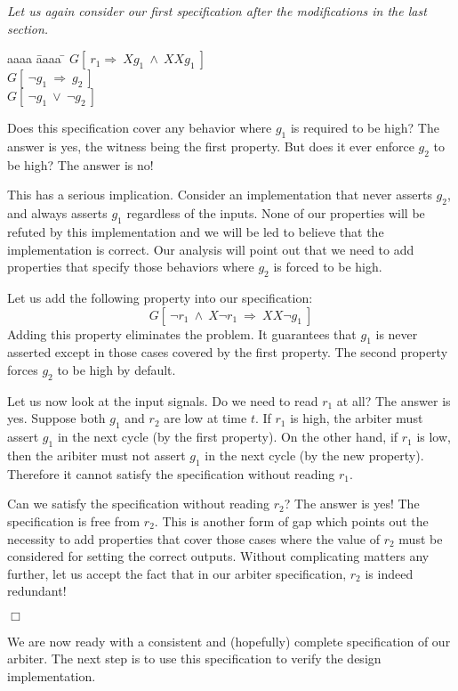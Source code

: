 \begin{example} \label{ex4}
{\em
Let us again consider our first specification after the modifications in the
last section.
\begin{tabbing}
aaaa \= aaaa \= \kill
\> $G[\ r_1 \Rightarrow\  Xg_1\ \land\  XXg_1\ ]$ \\
\> $G[\ \neg g_1\ \Rightarrow\  g_2\ ]$\\
\> $G[\ \neg g_1\ \lor\ \neg g_2\ ]$
\end{tabbing}
Does this specification cover any behavior where $g_1$ is required to be high?
The answer is yes, the witness being the first property. But does it ever
enforce $g_2$ to be high? The answer is no!

This has a serious implication. Consider an implementation that never asserts
$g_2$, and always asserts $g_1$ regardless of the inputs. None of our
properties will be refuted by this implementation and we will be led to
believe that the implementation is correct. Our analysis will point out
that we need to add properties that specify those behaviors where $g_2$
is forced to be high.

Let us add the following property into our specification:
\[ G[\ \neg r_1\ \land\  X\neg r_1\ \Rightarrow\ XX\neg g_1\ ] \]
Adding this property eliminates the problem. It guarantees that $g_1$ is never
asserted except in those cases covered by the first property. The second
property forces $g_2$ to be high by default.

Let us now look at the input signals. Do we need to read $r_1$ at all? The
answer is yes. Suppose both $g_1$ and $r_2$ are low at time $t$. If $r_1$
is high, the arbiter must assert $g_1$ in the next cycle (by the first
property). On the other hand, if $r_1$ is low, then the aribiter must
not assert $g_1$ in the next cycle (by the new property). Therefore it cannot
satisfy the specification without reading $r_1$.

Can we satisfy the specification without reading $r_2$? The answer is yes!
The specification is free from $r_2$. This is another form of gap which 
points out the necessity to add properties that cover those cases where
the value of $r_2$ must be considered for setting the correct outputs.
Without complicating matters any further, let us accept the fact that in our
arbiter specification, $r_2$ is indeed redundant!
} $\Box$
\end{example}

We are now ready with a consistent and (hopefully) complete specification
of our arbiter. The next step is to use this specification to verify the
design implementation.

